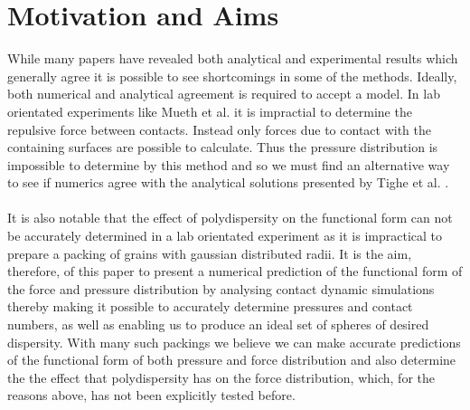 \documentclass[12pt] {article} %
\begin{document}
\section{Motivation and Aims}
While many papers have revealed both analytical and experimental results which generally agree it is possible to see shortcomings in some of the methods. Ideally, both numerical and analytical agreement is required to accept a model. In lab orientated experiments like Mueth et al. \cite{mueth} it is impractial to determine the repulsive force between contacts. Instead only forces due to contact with the containing surfaces are possible to calculate. Thus the pressure distribution is impossible to determine by this method and so we must find an alternative way to see if numerics agree with the analytical solutions presented by Tighe et al. \cite{tighepaper}. \\
\\
It is also notable that the effect of polydispersity on the functional form can not be accurately determined in a lab orientated experiment as it is impractical to prepare a packing of grains with gaussian distributed radii. It is the aim, therefore, of this paper to present a numerical prediction of the functional form of the force and pressure distribution by analysing contact dynamic simulations thereby making it possible to accurately determine pressures and contact numbers, as well as enabling us to produce an ideal set of spheres of desired dispersity. With many such packings we believe we can make accurate predictions of the functional form of both pressure and force distribution and also determine the  the effect that polydispersity has on the force distribution, which, for the reasons above, has not been explicitly tested before.
\end{document}
